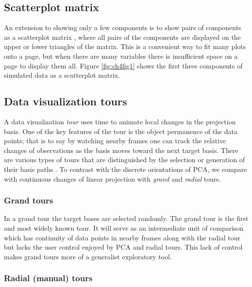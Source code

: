 \documentclass{template/monashthesis}
\begin{document}
\hypertarget{scatterplot-matrix}{%
\subsection{Scatterplot matrix}\label{scatterplot-matrix}}

An extension to showing only a few components is to show pairs of components as a scatterplot matrix \autocite{chambers_graphical_1983}, where all pairs of the components are displayed on the upper or lower triangles of the matrix. This is a convenient way to fit many plots onto a page, but when there are many variables there is insufficient space on a page to display them all. Figure \ref{fig:ch4fig1} shows the first three components of simulated data as a scatterplot matrix.

\hypertarget{data-visualization-tours}{%
\subsection{Data visualization tours}\label{data-visualization-tours}}

A data visualization \emph{tour} uses time to animate local changes in the projection basis. One of the key features of the tour is the object permanence of the data points; that is to say by watching nearby frames one can track the relative changes of observations as the basis moves toward the next target basis. There are various types of tours that are distinguished by the selection or generation of their basis paths \autocite{lee_review_2021,cook_grand_2008}. To contrast with the discrete orientations of PCA, we compare with continuous changes of linear projection with \emph{grand} and \emph{radial} tours.

\hypertarget{grand-tours}{%
\subsubsection{Grand tours}\label{grand-tours}}

In a grand tour \autocite{asimov_grand_1985} the target bases are selected randomly. The grand tour is the first and most widely known tour. It will serve as an intermediate unit of comparison which has continuity of data points in nearby frames along with the radial tour but lacks the user control enjoyed by PCA and radial tours. This lack of control makes grand tours more of a generalist exploratory tool.

\hypertarget{radial-manual-tours}{%
\subsubsection{Radial (manual) tours}\label{radial-manual-tours}}
\end{document}
